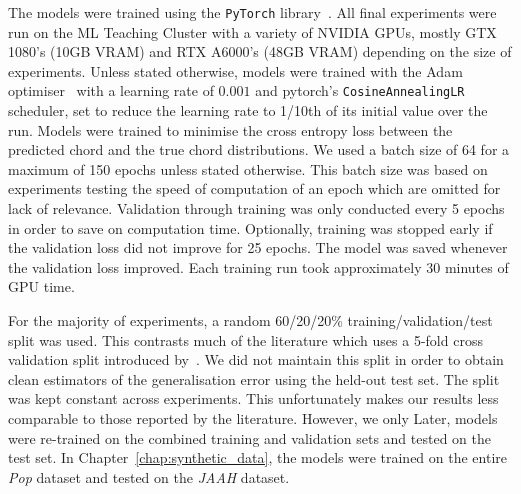 The models were trained using the \texttt{PyTorch} library~\citep{pytorch}. All final experiments were run on the ML Teaching Cluster with a variety of NVIDIA GPUs, mostly GTX 1080's (10GB VRAM) and RTX A6000's (48GB VRAM) depending on the size of experiments. Unless stated otherwise, models were trained with the Adam optimiser~\citep{adam} with a learning rate of $0.001$ and pytorch's \texttt{CosineAnnealingLR} scheduler, set to reduce the learning rate to 1/10th of its initial value over the run. Models were trained to minimise the cross entropy loss between the predicted chord and the true chord distributions. We used a batch size of 64 for a maximum of 150 epochs unless stated otherwise. This batch size was based on experiments testing the speed of computation of an epoch which are omitted for lack of relevance. Validation through training was only conducted every 5 epochs in order to save on computation time. Optionally, training was stopped early if the validation loss did not improve for 25 epochs. The model was saved whenever the validation loss improved. Each training run took approximately 30 minutes of GPU time. 

For the majority of experiments, a random 60/20/20\% training/validation/test split was used. This contrasts much of the literature which uses a 5-fold cross validation split introduced by~\citet{FourTimelyInsights}. We did not maintain this split in order to obtain clean estimators of the generalisation error using the held-out test set. The split was kept constant across experiments. This unfortunately makes our results less comparable to those reported by the literature. However, we only  Later, models were re-trained on the combined training and validation sets and tested on the test set. In Chapter~\ref{chap:synthetic_data}, the models were trained on the entire \emph{Pop} dataset and tested on the \emph{JAAH} dataset.